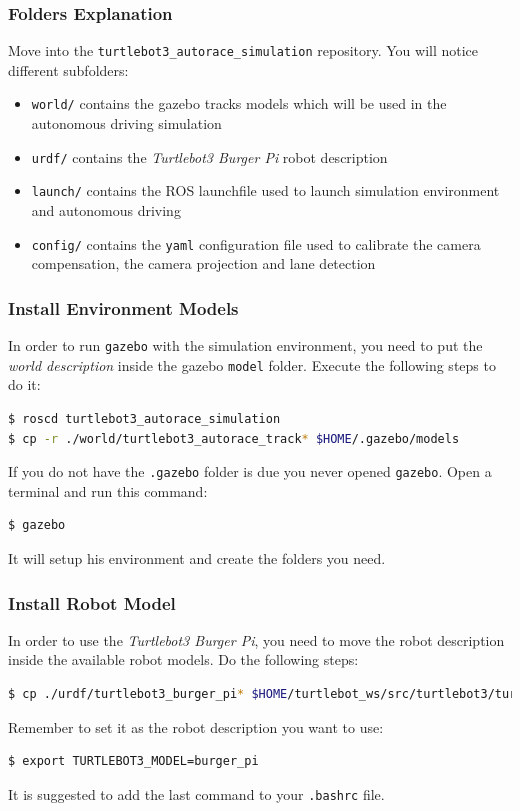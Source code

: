 
\begin{frame}[fragile]
	\frametitle{Folders Explanation}
	Move into the \verb|turtlebot3_autorace_simulation| repository. You will notice different subfolders:
	\begin{itemize}
		\item \texttt{world/} contains the gazebo tracks models which will be used in the autonomous driving simulation
		\item \texttt{urdf/} contains the \textit{Turtlebot3 Burger Pi} robot description
		\item \texttt{launch/} contains the ROS launchfile used to launch simulation environment and autonomous driving 
		\item \texttt{config/} contains the \verb$yaml$ configuration file used to calibrate the camera compensation, the camera projection and lane detection
	\end{itemize}
\end{frame}


\begin{frame}[fragile]
	\frametitle{Install Environment Models}
In order to run \texttt{gazebo} with the simulation environment, you need to put the \textit{world description} inside the gazebo \verb$model$ folder. Execute the following steps to do it:
\begin{lstlisting}[language=bash]
$ roscd turtlebot3_autorace_simulation
$ cp -r ./world/turtlebot3_autorace_track* $HOME/.gazebo/models
\end{lstlisting}

If you do not have the \verb$.gazebo$ folder is due you never opened \texttt{gazebo}.
Open a terminal and run this command:
\begin{lstlisting}[language=bash]
$ gazebo	
\end{lstlisting}
It will setup his environment and create the folders you need.
\end{frame}


\begin{frame}[fragile]
	\frametitle{Install Robot Model}
In order to use the \textit{Turtlebot3 Burger Pi}, you need to move the robot description inside the available robot models. Do the following steps:
\begin{lstlisting}[language=bash]
$ cp ./urdf/turtlebot3_burger_pi* $HOME/turtlebot_ws/src/turtlebot3/turtlebot3_description/urdf
\end{lstlisting}

Remember to set it as the robot description you want to use:

\begin{lstlisting}[language=bash]
$ export TURTLEBOT3_MODEL=burger_pi
\end{lstlisting}
It is suggested to add the last command to your \verb$.bashrc$ file.
\end{frame}
